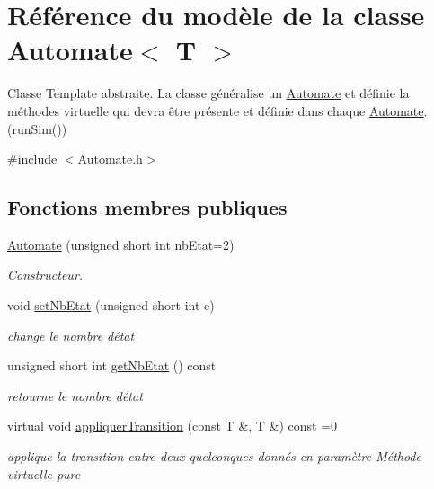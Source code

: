 \hypertarget{class_automate}{}\section{Référence du modèle de la classe Automate$<$ T $>$}
\label{class_automate}


Classe Template abstraite. La classe généralise un \hyperlink{class_automate}{Automate} et définie la méthodes virtuelle qui devra être présente et définie dans chaque \hyperlink{class_automate}{Automate}. (run\+Sim())  




{\ttfamily \#include $<$Automate.\+h$>$}

\subsection*{Fonctions membres publiques}
\begin{DoxyCompactItemize}
\item 
\hyperlink{class_automate_a3215065f896b7297a676219a0d80a045}{Automate} (unsigned short int nb\+Etat=2)
\begin{DoxyCompactList}\small\item\em Constructeur. \end{DoxyCompactList}\item 
void \hyperlink{class_automate_afcf89728c989465400a19174ef22dfa5}{set\+Nb\+Etat} (unsigned short int e)
\begin{DoxyCompactList}\small\item\em change le nombre d\textquotesingle{}état \end{DoxyCompactList}\item 
unsigned short int \hyperlink{class_automate_a80d9f6cfc6786ac21b51c4ab7fcb072d}{get\+Nb\+Etat} () const 
\begin{DoxyCompactList}\small\item\em retourne le nombre d\textquotesingle{}état \end{DoxyCompactList}\item 
virtual void \hyperlink{class_automate_abfeaddcc8930b1f63a785cd5c6ff6dc5}{appliquer\+Transition} (const T \&, T \&) const =0
\begin{DoxyCompactList}\small\item\em applique la transition entre deux quelconques donnés en paramètre Méthode virtuelle pure \end{DoxyCompactList}\end{DoxyCompactItemize}
